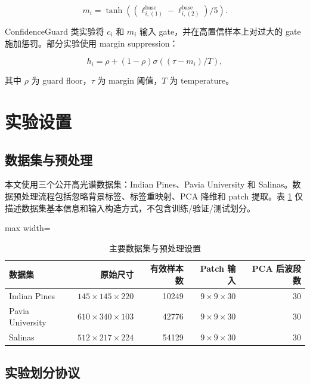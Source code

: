 \documentclass[UTF8,a4paper,zihao=-4,fontset=fandol]{ctexart}
\begin{document}
\begin{equation}
  m_i = \tanh((\ell^{\mathrm{base}}_{i,(1)}-\ell^{\mathrm{base}}_{i,(2)})/5).
\end{equation}

ConfidenceGuard 类实验将 $c_i$ 和 $m_i$ 输入 gate，并在高置信样本上对过大的 gate 施加惩罚。部分实验使用 margin suppression：

\begin{equation}
  h_i = \rho + (1-\rho)\sigma((\tau-m_i)/T),
\end{equation}

其中 $\rho$ 为 guard floor，$\tau$ 为 margin 阈值，$T$ 为 temperature。

\section{实验设置}

\subsection{数据集与预处理}

本文使用三个公开高光谱数据集：Indian Pines、Pavia University 和 Salinas。数据预处理流程包括忽略背景标签、标签重映射、PCA 降维和 patch 提取。表 \ref{tab:dataset-preprocess} 仅描述数据集基本信息和输入构造方式，不包含训练/验证/测试划分。

\begin{table}[htbp]
\centering
\caption{主要数据集与预处理设置}
\label{tab:dataset-preprocess}
\begin{adjustbox}{max width=\textwidth}
\begin{tabular}{lrrrr}
\toprule
数据集 & 原始尺寸 & 有效样本数 & Patch 输入 & PCA 后波段数 \\
\midrule
Indian Pines & $145\times145\times220$ & 10249 & $9\times9\times30$ & 30 \\
Pavia University & $610\times340\times103$ & 42776 & $9\times9\times30$ & 30 \\
Salinas & $512\times217\times224$ & 54129 & $9\times9\times30$ & 30 \\
\bottomrule
\end{tabular}
\end{adjustbox}
\end{table}

\subsection{实验划分协议}
\end{document}
